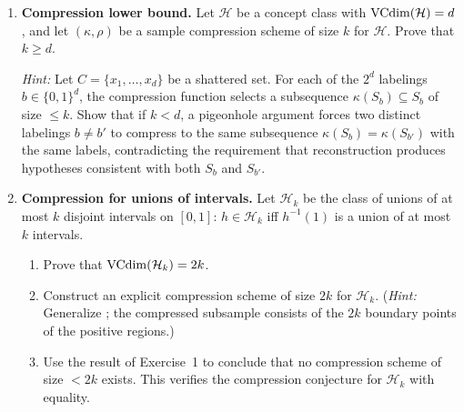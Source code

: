 \begin{enumerate}[leftmargin=*,itemsep=6pt]

\item \textbf{Compression lower bound.}
  Let $\mathcal{H}$ be a concept class with $\mathrm{VCdim}(\mathcal{H}) = d$, and
  let $(\kappa, \rho)$ be a sample compression scheme of size $k$ for
  $\mathcal{H}$.  Prove that $k \geq d$.

  \emph{Hint:} Let $C = \{x_1, \ldots, x_d\}$ be a shattered set.
  For each of the $2^d$ labelings $b \in \{0,1\}^d$, the compression
  function selects a subsequence $\kappa(S_b) \subseteq S_b$ of size
  $\leq k$.  Show that if $k < d$, a pigeonhole argument forces two
  distinct labelings $b \neq b'$ to compress to the same subsequence
  $\kappa(S_b) = \kappa(S_{b'})$ with the same labels, contradicting
  the requirement that reconstruction produces hypotheses consistent
  with both $S_b$ and $S_{b'}$.

\item \textbf{Compression for unions of intervals.}
  Let $\mathcal{H}_k$ be the class of unions of at most $k$ disjoint
  intervals on $[0,1]$: $h \in \mathcal{H}_k$ iff $h^{-1}(1)$ is a
  union of at most $k$ intervals.
  \begin{enumerate}[label=(\alph*)]
  \item Prove that $\mathrm{VCdim}(\mathcal{H}_k) = 2k$.
  \item Construct an explicit compression scheme of size $2k$ for
    $\mathcal{H}_k$.  (\emph{Hint:} Generalize
    ; the compressed subsample consists of
    the $2k$ boundary points of the positive regions.)
  \item Use the result of Exercise~1 to conclude that no compression
    scheme of size $< 2k$ exists.  This verifies the compression
    conjecture for $\mathcal{H}_k$ with equality.
  \end{enumerate}


\end{enumerate}
